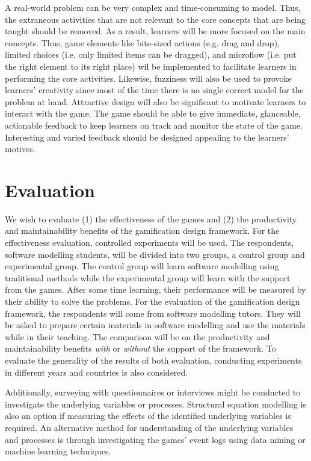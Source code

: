 \documentclass[runningheads,a4paper]{llncs}
\begin{document}
A real-world problem can be very complex and time-consuming to model. Thus, the extraneous activities that are not relevant to the core concepts that are being taught should be removed. As a result, learners will be more focused on the main concepts. Thus, game elements like bite-sized actions (e.g. drag and drop), limited choices (i.e. only limited items can be dragged), and microflow (i.e. put the right element to its right place) wil be implemented to facilitate learners in performing the core activities. Likewise, fuzziness will also be used to provoke learners' creativity since most of the time there is no single correct model for the problem at hand. Attractive design will also be significant to motivate learners to interact with the game. The game should be able to give immediate, glanceable, actionable feedback to keep learners on track and monitor the state of the game. Interesting and varied feedback should be designed appealing to the learners' motives. 

\section{Evaluation}
We wish to evaluate (1) the effectiveness of the games and (2) the productivity and maintainability benefits of the gamification design framework. For the effectiveness evaluation, controlled experiments will be used. The respondents, software modelling students, will be divided into two groups, a control group and experimental group. The control group will learn software modelling using traditional methods while the experimental group will learn with the support from the games. After some time learning, their performance will be measured by their ability to solve the problems. For the evaluation of the gamification design framework, the respondents will come from software modelling tutors. They will be asked to prepare certain materials in software modelling and use the materials while in their teaching. The comparison will be on the productivity and maintainability benefits \emph{with} or \emph{without} the support of the framework. To evaluate the generality of the results of both evaluation, conducting experiments in different years and countries is also considered.

Additionally, surveying with questionnaires or interviews might be conducted to investigate the underlying variables or processes. Structural equation modelling \cite{hair2016primer} is also an option if measuring the effects of the identified underlying variables is required. An alternative method for understanding of the underlying variables and processes is through investigating the games' event logs using data mining or machine learning techniques.
\end{document}
